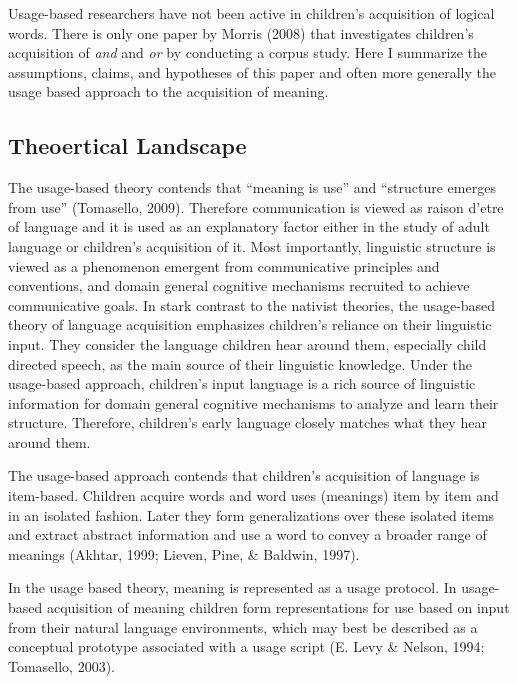 \documentclass[oneside]{report}
\theoremstyle{definition}
\theoremstyle{definition}
\theoremstyle{definition}
\theoremstyle{remark}
\begin{document}
Usage-based researchers have not been active in children's acquisition
of logical words. There is only one paper by Morris (2008) that
investigates children's acquisition of \emph{and} and \emph{or} by
conducting a corpus study. Here I summarize the assumptions, claims, and
hypotheses of this paper and often more generally the usage based
approach to the acquisition of meaning.

\subsection{Theoertical Landscape}\label{theoertical-landscape}

The usage-based theory contends that ``meaning is use'' and ``structure
emerges from use'' (Tomasello, 2009). Therefore communication is viewed
as raison d'etre of language and it is used as an explanatory factor
either in the study of adult language or children's acquisition of it.
Most importantly, linguistic structure is viewed as a phenomenon
emergent from communicative principles and conventions, and domain
general cognitive mechanisms recruited to achieve communicative goals.
In stark contrast to the nativist theories, the usage-based theory of
language acquisition emphasizes children's reliance on their linguistic
input. They consider the language children hear around them, especially
child directed speech, as the main source of their linguistic knowledge.
Under the usage-based approach, children's input language is a rich
source of linguistic information for domain general cognitive mechanisms
to analyze and learn their structure. Therefore, children's early
language closely matches what they hear around them.

The usage-based approach contends that children's acquisition of
language is item-based. Children acquire words and word uses (meanings)
item by item and in an isolated fashion. Later they form generalizations
over these isolated items and extract abstract information and use a
word to convey a broader range of meanings (Akhtar, 1999; Lieven, Pine,
\& Baldwin, 1997).

In the usage based theory, meaning is represented as a usage protocol.
In usage-based acquisition of meaning children form representations for
use based on input from their natural language environments, which may
best be described as a conceptual prototype associated with a usage
script (E. Levy \& Nelson, 1994; Tomasello, 2003).
\end{document}
